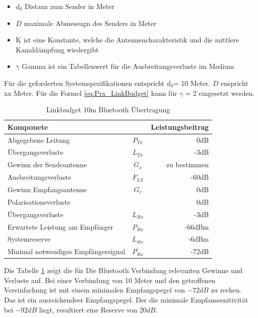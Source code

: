 \begin{itemize}
\item $d_{0}$ Distanz zum Sender in Meter
\item $D$ maximale Abmessugn des Senders in Meter
\item K ist eine Konstante, welche die Antennencharakteristik und die mittlere Kanaldämpfung wiedergibt
\item $\gamma$ Gamma ist ein Tabellenwert für die Ausbreitungsverluste im Medium 
\end{itemize}
Für die geforderten Systemspezifikationen entspricht $d_0$= 10 Meter. $D$ enspricht xx Meter. Für die Formel \ref{eq:Prx_LinkBudget} kann für $\gamma$ = 2 eingesetzt werden.\cite{Tekom}

\begin{table}[h]
  \centering
  \begin{tabular}{l c r} \toprule 
  Komponete                  	& 			&Leistungsbeitrag  \\ \midrule
  Abgegebene Leitung    			&$P_{Tx}$ 	& 0dB       \\
  Übergangsverluste              &$L_{Tx}$	& -3dB       \\
  Gewinn der Sendeantenne    	&$G_{x}$		& zu bestimmen        \\
  Ausbreitungsverluste   		& $F_{LS}$	& -60dB        \\
  Gewinn Empfangsantenne  		& $G_{r}$	& 0dB           \\
  Polarisationsverluste          & 	& 0dB            \\
  Übergangsverluste              & $L_{Rx}$	& -3dB            \\
  Erwartete Leistung am Empfänger & $P_{Rx}$  & -66dBm \cite{CC2541} \\ \midrule
  Systemreserve        			 & $L_{div}$&-6dBm \\ 
  Minimal notwendiges Empfängersignal &$P_{Rx}^{'}$ & -72dB \\ \bottomrule
  \end{tabular}
  \caption{Linkbudget 10m Bluetooth Übertragung}
  \label{tab:Linkbudget}
\end{table}

Die Tabelle \ref{tab:Linkbudget} zeigt die für Die Bluetooth Verbindung relevanten Gewinne und Verluste auf. Bei einer Verbindung von 10 Meter und den getroffenen Vereinfachung ist mit einem minimalen Empfangspegel von $-72dB$ zu rechen. Das ist ein ausreichendeer Empfangspegel. Der die minimale Empfanssenitivität bei $-92dB$ liegt, resultiert eine Reserve von $20dB$.
\newpage
